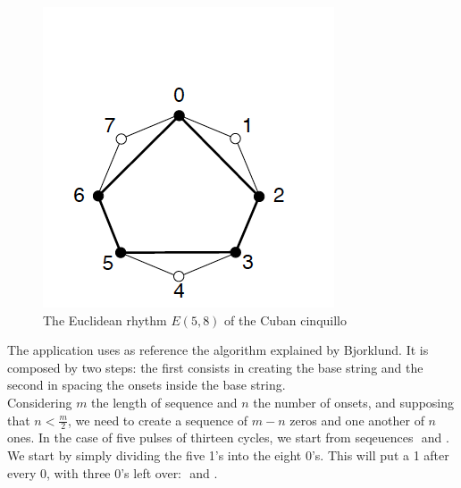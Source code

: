 \documentclass[main.tex]{subfiles}
\begin{document}
\begin{figure}[htbp]
\centering
\includegraphics{images/cuban_cinquillo.png}
\caption{The Euclidean rhythm $E(5,8)$ of the Cuban cinquillo}
\label{fig:1}
\end{figure}
The application uses as reference the algorithm explained by Bjorklund\cite{Bjorklund:2003:euclidean:rhythm}. It is composed by two steps: the first consists in creating the base string and the second in spacing the onsets inside the base string.\\
Considering \begin{math}m\end{math} the length of sequence and \begin{math}n\end{math} the number of onsets, and supposing that \begin{math}n<\frac{m}{2}\end{math}, we need to create a sequence of \begin{math}m-n\end{math} zeros and one another of \begin{math}n\end{math} ones. In the case of five pulses of thirteen cycles, we start from seqeuences \begin{math}[00000000]\end{math} and \begin{math}[11111]\end{math}.\\
We start by simply dividing the five 1’s into the eight 0’s. This will put a 1 after every 0, with three 0’s left over: \begin{math}[0101010101]\end{math} and \begin{math}[000]\end{math}.\\
\end{document}
